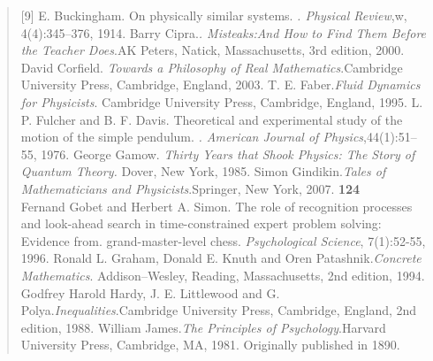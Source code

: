 \documentclass[a4paper,fleqn]{book}
\begin{document}
\begin{quote}
[9]\; E. Buckingham. On physically similar systems. \emph{. Physical Review},w, 4(4):345–376,
1914.\newline\newline
[10]\; Barry Cipra.\emph{. Misteaks:And How to Find Them Before the Teacher Does}.AK Peters,
Natick, Massachusetts, 3rd edition, 2000.\newline\newline
[11]\; David Corfield. \emph{Towards a Philosophy of Real Mathematics}.Cambridge University
Press, Cambridge, England, 2003.\newline\newline
[12]\; T. E. Faber.\emph{Fluid Dynamics for Physicists}. Cambridge University Press, Cambridge,
England, 1995.\newline\newline
[13]\; L. P. Fulcher and B. F. Davis. Theoretical and experimental study of the motion
of the simple pendulum. \emph{. American Journal of Physics},44(1):51–55, 1976.\newline\newline
[14]\; George Gamow. \emph{Thirty Years that Shook Physics: The Story of Quantum Theory.}
Dover, New York, 1985.\newline\newline
[15]\; Simon Gindikin.\emph{Tales of Mathematicians and Physicists}.Springer, New York, 2007.
\newpage
\large\textbf{124} \hfill\\
\normalsize\pagestyle{empty}\newline\newline
[16]\; Fernand Gobet and Herbert A. Simon. The role of recognition processes and
look-ahead search in time-constrained expert problem solving: Evidence from. grand-master-level chess. \emph{Psychological Science}, 7(1):52-55, 1996.\newline\newline
[17]\; Ronald L. Graham, Donald E. Knuth and Oren Patashnik.\emph{Concrete Mathematics}.
Addison–Wesley, Reading, Massachusetts, 2nd edition, 1994.\newline\newline
[18]\; Godfrey Harold Hardy, J. E. Littlewood and G. Polya.\emph{Inequalities}.Cambridge
University Press, Cambridge, England, 2nd edition, 1988.\newline\newline
[19]\; William James.\emph{The Principles of Psychology}.Harvard University Press, Cambridge,
MA, 1981. Originally published in 1890.\newline\newline

\end{quote}
\end{document}
